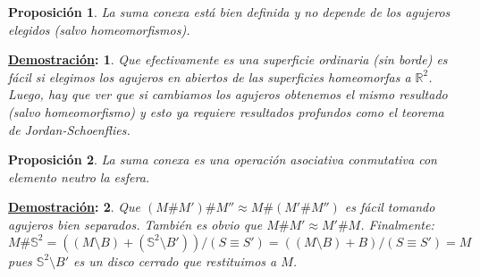 \documentclass[10pt,a4paper,openright]{book}
\theoremstyle{break}
\newtheorem*{prop}{Proposición}
\newtheorem*{demo}{\underline{Demostración}:}
\begin{document}
\begin{prop}
La suma conexa está bien definida y no depende de los agujeros elegidos (salvo homeomorfismos).
\end{prop}
\begin{demo}
Que efectivamente es una superficie ordinaria (sin borde) es fácil si elegimos los agujeros en abiertos de las superficies homeomorfas a $\mathbb{R}^{2}$. Luego, hay que ver que si cambiamos los agujeros obtenemos el mismo resultado (salvo homeomorfismo) y esto ya requiere resultados profundos como el teorema de Jordan-Schoenflies.
\end{demo}

\begin{prop}
La suma conexa es una operación asociativa conmutativa con elemento neutro la esfera.
\end{prop}
\begin{demo}
Que $\left( M \# M' \right) \# M'' \approx M \# \left( M' \# M'' \right)$ es fácil tomando agujeros bien separados. También es obvio que $M \# M' \approx M' \# M$. Finalmente:
\[
M \# \mathbb{S}^{2} = \left( \left( M \setminus B \right) + \left( \mathbb{S}^{2} \setminus B' \right) \right) / \left( S \equiv S' \right) = \left( \left( M \setminus B \right) + B \right) / \left( S \equiv S' \right) = M
\]
pues $\mathbb{S}^{2} \setminus B'$ es un disco cerrado que restituimos a $M$.
\end{demo}
\end{document}
